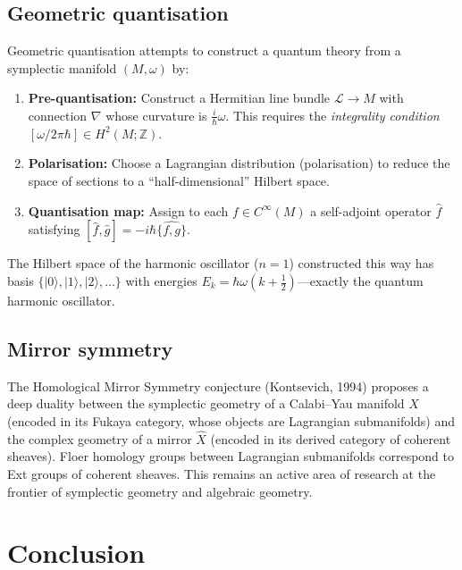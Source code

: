 \documentclass[12pt,a4paper]{amsart}
\theoremstyle{definition}
\begin{document}
\subsection{Geometric quantisation}

Geometric quantisation attempts to construct a quantum theory from a
symplectic manifold $(M, \omega)$ by:
\begin{enumerate}[label=(\arabic*)]
  \item \textbf{Pre-quantisation:} Construct a Hermitian line bundle $\mathcal{L}
    \to M$ with connection $\nabla$ whose curvature is $\frac{i}{\hbar}\omega$.
    This requires the \emph{integrality condition} $[\omega/2\pi\hbar] \in
    H^2(M; \mathbb{Z})$.
  \item \textbf{Polarisation:} Choose a Lagrangian distribution (polarisation)
    to reduce the space of sections to a ``half-dimensional'' Hilbert space.
  \item \textbf{Quantisation map:} Assign to each $f \in C^\infty(M)$ a
    self-adjoint operator $\hat{f}$ satisfying $[\hat{f}, \hat{g}] = -i\hbar
    \widehat{\{f,g\}}$.
\end{enumerate}

The Hilbert space of the harmonic oscillator ($n = 1$) constructed this way
has basis $\{|0\rangle, |1\rangle, |2\rangle, \ldots\}$ with energies
$E_k = \hbar\omega(k + \frac{1}{2})$---exactly the quantum harmonic oscillator.

\subsection{Mirror symmetry}

The Homological Mirror Symmetry conjecture (Kontsevich, 1994) proposes a deep
duality between the symplectic geometry of a Calabi--Yau manifold $X$ (encoded
in its Fukaya category, whose objects are Lagrangian submanifolds) and the
complex geometry of a mirror $\hat{X}$ (encoded in its derived category of
coherent sheaves).  Floer homology groups between Lagrangian submanifolds
correspond to Ext groups of coherent sheaves.  This remains an active area
of research at the frontier of symplectic geometry and algebraic geometry.

\section*{Conclusion}
\end{document}
